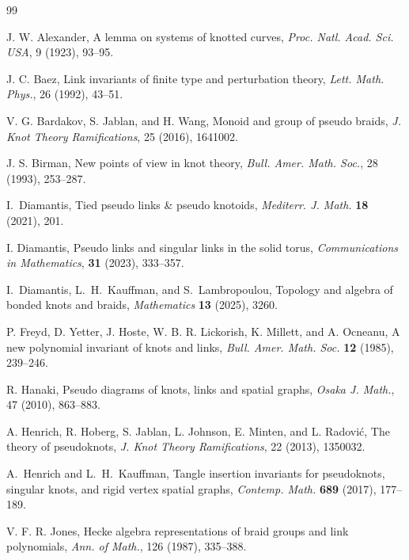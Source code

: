 \documentclass[11pt]{article}
\numberwithin{equation}{section}
\theoremstyle{definition}
\begin{document}
\begin{thebibliography}{99}

J. W. Alexander,
\newblock A lemma on systems of knotted curves,
\newblock \emph{Proc. Natl. Acad. Sci. USA}, 9 (1923), 93--95.

J. C. Baez,
\newblock Link invariants of finite type and perturbation theory,
\newblock \emph{Lett. Math. Phys.}, 26 (1992), 43--51.

V. G. Bardakov, S. Jablan, and H. Wang,
\newblock Monoid and group of pseudo braids,
\newblock \emph{J. Knot Theory Ramifications}, 25 (2016), 1641002.

J. S. Birman,
\newblock New points of view in knot theory,
\newblock \emph{Bull. Amer. Math. Soc.}, 28 (1993), 253--287.

I.~Diamantis,
\newblock Tied pseudo links \& pseudo knotoids,
\newblock \emph{Mediterr. J. Math.} \textbf{18} (2021), 201.

I. Diamantis,
\newblock Pseudo links and singular links in the solid torus,
\newblock \emph{Communications in Mathematics}, \textbf{31} (2023), 333--357.

I.~Diamantis, L.~H.~Kauffman, and S.~Lambropoulou,
\newblock Topology and algebra of bonded knots and braids,
\newblock \emph{Mathematics} \textbf{13} (2025), 3260.

P. Freyd, D. Yetter, J. Hoste, W. B. R. Lickorish, K. Millett, and A. Ocneanu,
\newblock A new polynomial invariant of knots and links,
\newblock \emph{Bull. Amer. Math. Soc.} \textbf{12} (1985), 239--246.

R. Hanaki,
\newblock Pseudo diagrams of knots, links and spatial graphs,
\newblock \emph{Osaka J. Math.}, 47 (2010), 863--883.

A. Henrich, R. Hoberg, S. Jablan, L. Johnson, E. Minten, and L. Radović,
\newblock The theory of pseudoknots,
\newblock \emph{J. Knot Theory Ramifications}, 22 (2013), 1350032.

A.~Henrich and L.~H.~Kauffman,
\newblock Tangle insertion invariants for pseudoknots, singular knots, and rigid vertex spatial graphs,
\newblock \emph{Contemp. Math.} \textbf{689} (2017), 177--189.

V. F. R. Jones,
\newblock Hecke algebra representations of braid groups and link polynomials,
\newblock \emph{Ann. of Math.}, 126 (1987), 335--388.


\end{thebibliography}
\end{document}
